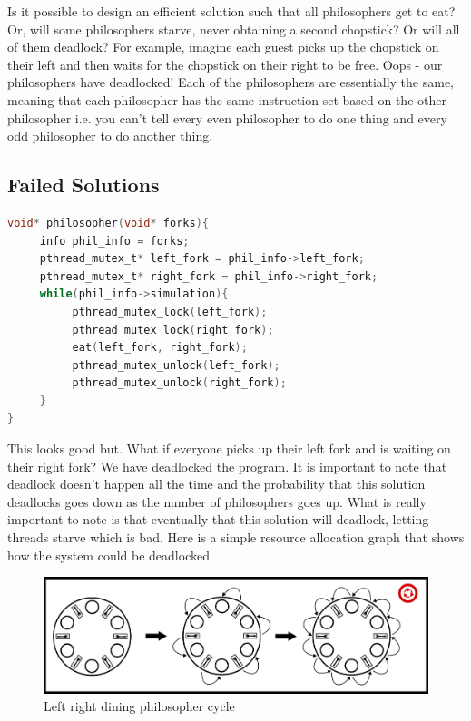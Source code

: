 Is it possible to design an efficient solution such that all philosophers get to eat?
Or, will some philosophers starve, never obtaining a second chopstick?
Or will all of them deadlock?
For example, imagine each guest picks up the chopstick on their left and then waits for the chopstick on their right to be free.
Oops - our philosophers have deadlocked!
Each of the philosophers are essentially the same, meaning that each philosopher has the same instruction set based on the other philosopher i.e. you can't tell every even philosopher to do one thing and every odd philosopher to do another thing.


\subsection{Failed Solutions}

\begin{lstlisting}[language=C]
void* philosopher(void* forks){
     info phil_info = forks;
     pthread_mutex_t* left_fork = phil_info->left_fork;
     pthread_mutex_t* right_fork = phil_info->right_fork;
     while(phil_info->simulation){
          pthread_mutex_lock(left_fork);
          pthread_mutex_lock(right_fork);
          eat(left_fork, right_fork);
          pthread_mutex_unlock(left_fork);
          pthread_mutex_unlock(right_fork);
     }
}
\end{lstlisting}

This looks good but.
What if everyone picks up their left fork and is waiting on their right fork? We have deadlocked the program.
It is important to note that deadlock doesn't happen all the time and the probability that this solution deadlocks goes down as the number of philosophers goes up.
What is really important to note is that eventually that this solution will deadlock, letting threads starve which is bad.
Here is a simple resource allocation graph that shows how the system could be deadlocked

\begin{figure}[H]
\centering
\includegraphics[width=.9\textwidth]{deadlock/drawings/dining_naive.png}
\caption{Left right dining philosopher cycle}
\end{figure}



